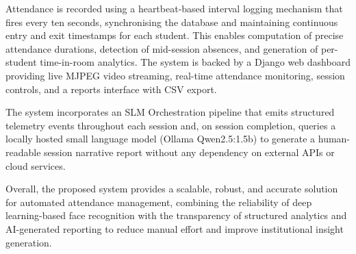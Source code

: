 \documentclass{report}
\begin{document}
{Attendance is recorded using a heartbeat-based interval logging mechanism that fires every ten seconds,\vspace{3pt} synchronising the database and maintaining continuous entry and exit timestamps for each student. This\vspace{3pt} enables computation of precise attendance durations, detection of mid-session absences, and generation\vspace{3pt} of per-student time-in-room analytics. The system is backed by a Django web dashboard providing live\vspace{3pt} MJPEG video streaming, real-time attendance monitoring, session controls, and a reports interface with\vspace{3pt} CSV export.

The system incorporates an SLM Orchestration pipeline that emits structured telemetry events throughout\vspace{3pt} each session and, on session completion, queries a locally hosted small language model (Ollama\vspace{3pt} Qwen2.5:1.5b) to generate a human-readable session narrative report without any dependency on\vspace{3pt} external APIs or cloud services.

Overall, the proposed system provides a scalable, robust, and accurate solution for automated attendance\vspace{3pt} management, combining the reliability of deep learning-based face recognition with the transparency of\vspace{3pt} structured analytics and AI-generated reporting to reduce manual effort and improve institutional insight\vspace{3pt} generation.}
\end{document}
